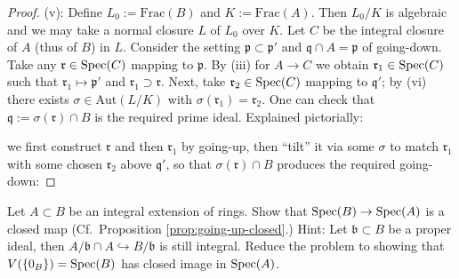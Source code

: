 \begin{proof}
	(v): Define $L_0 := \text{Frac}(B)$ and $K := \text{Frac}(A)$. Then $L_0/K$ is algebraic and we may take a normal closure $L$ of $L_0$ over $K$. Let $C$ be the integral closure of $A$ (thus of $B$) in $L$. Consider the setting $\mathfrak{p} \subset \mathfrak{p}'$ and $\mathfrak{q} \cap A = \mathfrak{p}$ of going-down. Take any $\mathfrak{r} \in \operatorname{Spec}(C)$ mapping to $\mathfrak{p}$. By (iii) for $A \to C$ we obtain $\mathfrak{r}_1 \in \operatorname{Spec}(C)$ such that $\mathfrak{r}_1 \mapsto \mathfrak{p}'$ and $\mathfrak{r}_1 \supset \mathfrak{r}$. Next, take $\mathfrak{r}_2 \in \operatorname{Spec}(C)$ mapping to $\mathfrak{q}'$; by (vi) there exists $\sigma \in \text{Aut}(L/K)$ with $\sigma(\mathfrak{r}_1) = \mathfrak{r}_2$. One can check that $\mathfrak{q} := \sigma(\mathfrak{r}) \cap B$ is the required prime ideal. Explained pictorially:
	\begin{center}\end{center}
	we first construct $\mathfrak{r}$ and then $\mathfrak{r}_1$ by going-up, then ``tilt'' it via some $\sigma$ to match $\mathfrak{r}_1$ with some chosen $\mathfrak{r}_2$ above $\mathfrak{q}'$, so that $\sigma(\mathfrak{r}) \cap B$ produces the required going-down:
\end{proof}

\begin{exercise}\label{exo:integral-closed}
	Let $A \subset B$ be an integral extension of rings. Show that $\operatorname{Spec}(B) \to \operatorname{Spec}(A)$ is a closed map (Cf.\ Proposition \ref{prop:going-up-closed}.) Hint: Let $\mathfrak{b} \subset B$ be a proper ideal, then $A/\mathfrak{b} \cap A \hookrightarrow B/\mathfrak{b}$ is still integral. Reduce the problem to showing that $V(\{0_B\}) = \operatorname{Spec}(B)$ has closed image in $\operatorname{Spec}(A)$.
\end{exercise}

